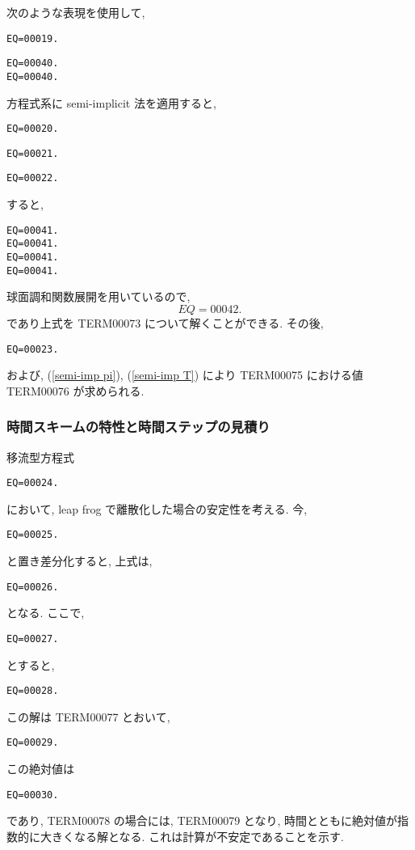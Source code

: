 次のような表現を使用して,
%
\begin{verbatim}
EQ=00019.
\end{verbatim}
%
\begin{verbatim}
EQ=00040.
EQ=00040.
\end{verbatim}
%
方程式系に semi-implicit 法を適用すると,
%
\begin{verbatim}
EQ=00020.
\end{verbatim}
%
\begin{verbatim}
EQ=00021.
\end{verbatim}
%
\begin{verbatim}
EQ=00022.
\end{verbatim}


すると, 
%
\begin{verbatim}
EQ=00041.
EQ=00041.
EQ=00041.
EQ=00041.
\end{verbatim}

球面調和関数展開を用いているので,
\[
EQ=00042.
\]
であり上式を TERM00073 について解くことができる.
%
その後,
%
\begin{verbatim}
EQ=00023.
\end{verbatim}
%
および, (\ref{semi-imp pi}), (\ref{semi-imp T})
により TERM00075 における値 TERM00076
が求められる.

\subsubsection{時間スキームの特性と時間ステップの見積り}

移流型方程式 
\begin{verbatim}
EQ=00024.
\end{verbatim}
において,  leap frog で離散化した場合の安定性を考える.
今, 
\begin{verbatim}
EQ=00025.
\end{verbatim}
と置き差分化すると, 上式は,
\begin{verbatim}
EQ=00026.
\end{verbatim}
となる.
ここで,
\begin{verbatim}
EQ=00027.
\end{verbatim}
とすると,
\begin{verbatim}
EQ=00028.
\end{verbatim}
この解は TERM00077 とおいて,
\begin{verbatim}
EQ=00029.
\end{verbatim}

この絶対値は
\begin{verbatim}
EQ=00030.
\end{verbatim}
であり, TERM00078 の場合には, TERM00079 となり,
時間とともに絶対値が指数的に大きくなる解となる.
これは計算が不安定であることを示す.

